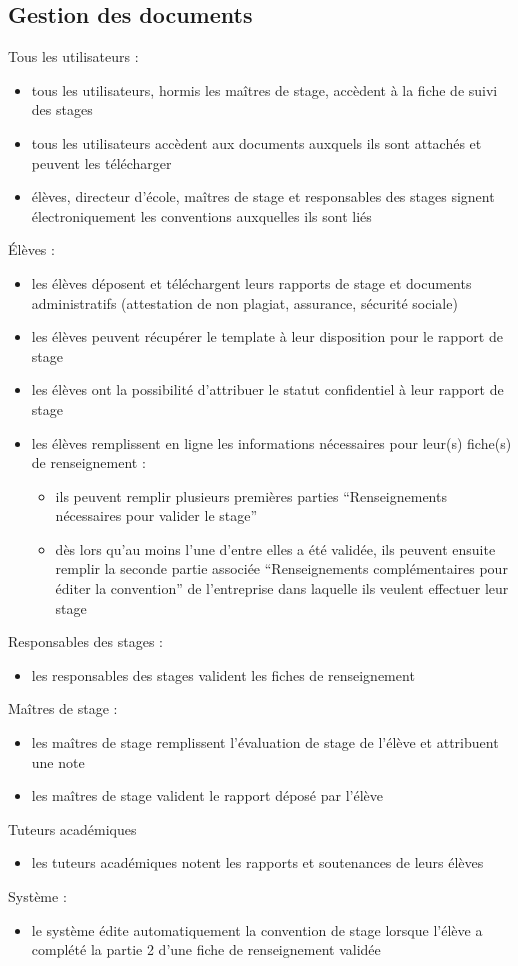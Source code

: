 \documentclass{scrreprt}
\begin{document}
\subsection{Gestion des documents}
Tous les utilisateurs : 
\begin{itemize}
\item tous les utilisateurs, hormis les ma\^itres de stage, acc\`edent \`a la fiche de suivi des stages
\item tous les utilisateurs acc\`edent aux documents auxquels ils sont attach\'es et peuvent les t\'el\'echarger
\item \'el\`eves, directeur d’\'ecole, ma\^itres de stage et responsables des stages signent \'electroniquement les conventions auxquelles ils sont li\'es
\end{itemize}
\'El\`eves :
\begin{itemize}
\item les \'el\`eves d\'eposent et t\'el\'echargent leurs rapports de stage et documents administratifs (attestation de non plagiat, assurance, s\'ecurit\'e sociale)
\item les \'el\`eves peuvent r\'ecup\'erer le template \`a leur disposition pour le rapport de stage
\item les \'el\`eves ont la possibilit\'e d’attribuer le statut confidentiel \`a leur rapport de stage
\item les \'el\`eves remplissent en ligne les informations n\'ecessaires pour leur(s) fiche(s) de renseignement :
\begin{itemize}
\item ils peuvent remplir plusieurs premi\`eres parties “Renseignements n\'ecessaires pour valider le stage”
\item dès lors qu’au moins l’une d’entre elles a \'et\'e valid\'ee, ils peuvent ensuite remplir la seconde partie associée “Renseignements complémentaires pour éditer la convention” de l’entreprise dans laquelle ils veulent effectuer leur stage
\end{itemize}
\end{itemize}
Responsables des stages :  
\begin{itemize}
\item les responsables des stages valident les fiches de renseignement
\end{itemize}
Ma\^itres de stage : 
\begin{itemize}
\item les ma\^itres de stage remplissent l’\'evaluation de stage de l’\'el\`eve et attribuent une note
\item les ma\^itres de stage valident le rapport d\'epos\'e par l’\'el\`eve
\end{itemize}
Tuteurs acad\'emiques
\begin{itemize}
\item les tuteurs acad\'emiques notent les rapports et soutenances de leurs \'el\`eves
\end{itemize}
Syst\`eme :
\begin{itemize}
\item le syst\`eme \'edite automatiquement la convention de stage lorsque l’\'el\`eve a compl\'et\'e la partie 2 d’une fiche de renseignement valid\'ee
\end{itemize}
\end{document}
